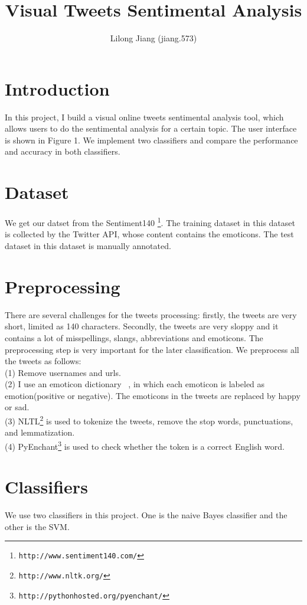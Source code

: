 \documentclass{article}
\begin{document}
\title{Visual Tweets Sentimental Analysis}
\author{Lilong Jiang (jiang.573)}
\maketitle

\section{Introduction}
In this project, I build a visual online tweets sentimental analysis tool, which allows users to do the sentimental analysis for a certain topic. The user interface is shown in Figure 1. We implement two classifiers and compare the performance and accuracy in both classifiers. 
\section{Dataset}
We get our datset from the Sentiment140 \footnote{\texttt{\scriptsize{http://www.sentiment140.com/‎}}}. The training dataset in this dataset is collected by the Twitter API, whose content contains the emoticons. The test dataset in this dataset is manually annotated.
\section{Preprocessing}
There are several challenges for the tweets processing: firstly, the tweets are very short, limited as 140 characters. Secondly, the tweets are very sloppy and it contains a lot of misspellings, slangs, abbreviations and emoticons. The preprocessing step is very important for the later classification.
We preprocess all the tweets as follows: \\
(1) Remove usernames and urls. \\
(2) I use an emoticon dictionary ~\cite{agarwal2011sentiment}, in which each emoticon is labeled as emotion(positive or negative). The emoticons in the tweets are replaced by happy or sad. \\
(3) NLTL\footnote{\texttt{\scriptsize{http://www.nltk.org/‎‎}}} is used to tokenize the tweets, remove the stop words, punctuations, and lemmatization. \\
(4) PyEnchant\footnote{\texttt{\scriptsize{http://pythonhosted.org/pyenchant/‎‎}}} is used to check whether the token is a correct English word. \\ 
\section{Classifiers}
We use two classifiers in this project. One is the naive Bayes classifier and the other is the SVM. 
\end{document}
